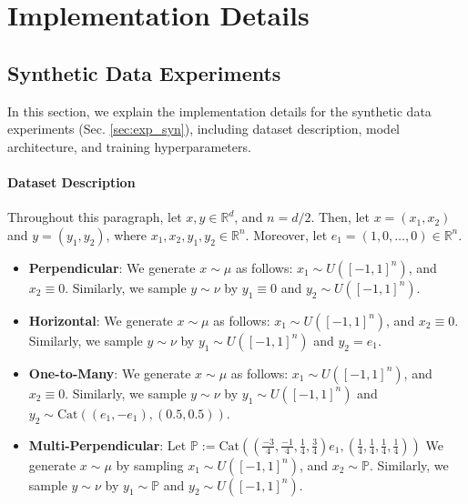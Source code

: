 \section{Implementation Details} \label{appen:implementation_details}

\subsection{Synthetic Data Experiments}
\label{appen:exp_syn}

In this section, we explain the implementation details for the synthetic data experiments (Sec. \ref{sec:exp_syn}), including dataset description, model architecture, and training hyperparameters.

\paragraph{Dataset Description}
Throughout this paragraph, let $x, y\in \mathbb{R}^d$, and $n = d/2$. Then, let $x = (x_1, x_2)$ and $y = (y_1, y_2)$, where $x_1, x_2, y_1, y_2 \in \mathbb{R}^n$. Moreover, let $e_1 = (1, 0, \dots, 0)\in \mathbb{R}^n$.
\begin{itemize}
    \item \textbf{Perpendicular}: We generate $x\sim \mu$ as follows: $x_1 \sim U\left( [-1, 1]^n \right)$, and $x_2 \equiv 0$. Similarly, we sample $y\sim \nu$ by $y_1 \equiv 0$ and $y_2 \sim U\left( [-1,1]^n \right)$.
    \item \textbf{Horizontal}: We generate $x\sim \mu$ as follows: $x_1 \sim U\left( [-1, 1]^n \right)$, and $x_2 \equiv 0$. Similarly, we sample $y\sim \nu$ by $y_1 \sim U\left( [-1,1]^n \right)$ and $y_2 = e_1$.
    \item \textbf{One-to-Many}: We generate $x\sim \mu$ as follows: $x_1 \sim U\left( [-1, 1]^n \right)$, and $x_2 \equiv 0$. Similarly, we sample $y\sim \nu$ by $y_1 \sim U\left( [-1,1]^n \right)$ and $y_2 \sim \text{Cat}((e_1, -e_1), (0.5,0.5))$.
    \item \textbf{Multi-Perpendicular}: Let $\mathbb{P} := \text{Cat}\left((\frac{-3}{4}, \frac{-1}{4}, \frac{1}{4}, \frac{3}{4})e_1, (\frac{1}{4},\frac{1}{4},\frac{1}{4},\frac{1}{4})\right)$ We generate $x\sim \mu$ by sampling $x_1 \sim U\left( [-1, 1]^n \right)$, and $x_2 \sim \mathbb{P}$. Similarly, we sample $y\sim \nu$ by $y_1 \sim \mathbb{P}$ and $y_2 \sim U\left( [-1, 1]^n \right)$.
\end{itemize}


